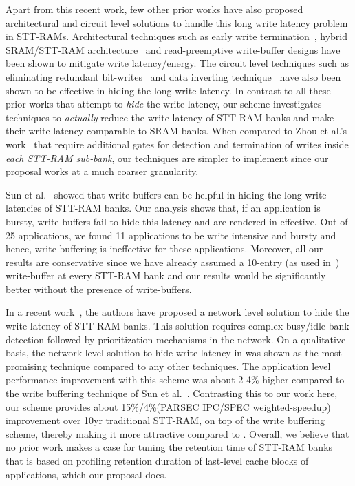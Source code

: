 Apart from this recent work, few other prior works have also proposed architectural and circuit level
solutions to handle this long write latency problem in STT-RAMs. Architectural techniques such as
early write termination~\cite{mram-energy-reduction}, hybrid SRAM/STT-RAM
architecture~\cite{gsun-hpca, Qureshi:2009:SHPMM} and read-preemptive write-buffer designs have been
shown to mitigate write latency/energy. The circuit level techniques such as eliminating redundant
bit-writes~\cite{mram-energy-reduction} and data inverting technique~\cite{gsun-hpca} have also been
shown to be effective in hiding the long write latency. In contrast to all these prior works that
attempt to {\it hide} the write latency, our scheme investigates techniques to {\it actually} reduce
the write latency of STT-RAM banks and make their write latency comparable to SRAM banks. When
compared to Zhou et al.'s work~\cite{mram-energy-reduction} that require additional gates for
detection and termination of writes inside {\it each STT-RAM sub-bank}, our techniques are simpler to
implement since our proposal works at a much coarser granularity.

Sun et al.~\cite{gsun-hpca} showed that write buffers can be helpful in hiding the long write
latencies of STT-RAM banks. Our analysis shows that, if an application is bursty, write-buffers fail
to hide this latency and are rendered in-effective. Out of 25 applications, we found 11 applications
to be write intensive and bursty and hence, write-buffering is ineffective for these applications.
Moreover, all our results are conservative since we have already assumed a 10-entry (as used
in~\cite{gsun-hpca}) write-buffer at every STT-RAM bank and our results would be significantly better
without the presence of write-buffers.

In a recent work~\cite{mram-noc}, the authors have proposed a network level solution to hide the
write latency of STT-RAM banks. This solution requires complex busy/idle bank detection followed by
prioritization mechanisms in the network. On a qualitative basis, the network level solution to hide
write latency in \cite{mram-noc} was shown as the most promising technique compared to any other
techniques. The application level performance improvement with this scheme was about 2-4\% higher
compared to the write buffering technique of Sun et al.~\cite{gsun-hpca}. Contrasting this to our
work here, our scheme provides about 15\%/4\%(PARSEC IPC/SPEC weighted-speedup) improvement over 10yr
traditional STT-RAM, on top of the write buffering scheme, thereby making it more attractive compared
to \cite{mram-noc}. Overall, we believe that no prior work makes a case for tuning the retention time
of STT-RAM banks that is based on profiling retention duration of last-level cache blocks of
applications, which our proposal does.
